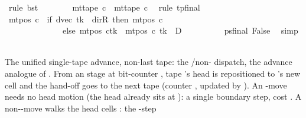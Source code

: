 \begin{isabellebody}
\ {\isacharparenleft}{\kern0pt}rule\ bst{\isacharparenright}{\kern0pt}\isanewline
\ \ \ \ \ \ \isamarkupfalse%
\ {\isachardoublequoteopen}mt{\isacharunderscore}{\kern0pt}tape\ c{\isacharprime}{\kern0pt}\ {\isacharequal}{\kern0pt}\ mt{\isacharunderscore}{\kern0pt}tape\ c{}{\isachardoublequoteclose}\ \isamarkupfalse%
\ {\isacharparenleft}{\kern0pt}rule\ tp{\isacharunderscore}{\kern0pt}final{\isacharparenright}{\kern0pt}\isanewline
\ \ \ \ \ \ \isamarkupfalse%
\ {\isachardoublequoteopen}mt{\isacharunderscore}{\kern0pt}pos\ c{\isacharprime}{\kern0pt}\ {\isacharequal}{\kern0pt}\ {\isacharparenleft}{\kern0pt}if\ dvec\ tk\ {\isacharequal}{\kern0pt}\ dir{\isachardot}{\kern0pt}R\ then\ mt{\isacharunderscore}{\kern0pt}pos\ c{}\isanewline
\ \ \ \ \ \ \ \ \ \ \ \ \ \ else\ {\isacharparenleft}{\kern0pt}mt{\isacharunderscore}{\kern0pt}pos\ c{}{\isacharparenright}{\kern0pt}{\isacharparenleft}{\kern0pt}tk\ {\isacharcolon}{\kern0pt}{\isacharequal}{\kern0pt}\ mt{\isacharunderscore}{\kern0pt}pos\ c{}\ tk\ {\isacharminus}{\kern0pt}\ {\isacharquery}{\kern0pt}D{\isacharparenright}{\kern0pt}{\isacharparenright}{\kern0pt}{\isachardoublequoteclose}\isanewline
\ \ \ \ \ \ \ \ \isamarkupfalse%
\ ps{\isacharunderscore}{\kern0pt}final\ False\ \isamarkupfalse%
\ simp\isanewline
\ \ \ \ \isamarkupfalse%
\isanewline
\ \ \isamarkupfalse%
\isanewline
{}\isamarkupfalse%
%
\endisatagproof
{\isafoldproof}%
%
\isadelimproof
%
\endisadelimproof
%
\begin{isamarkuptext}%
The unified single-tape advance, non-last tape: the
  /non- dispatch, the advance analogue of
  .  From an  stage at
  bit-counter , tape 's head is repositioned to
  's new cell and the hand-off goes to the next tape
   (counter ,  updated by
  ).  An -move needs no head motion (the
  head already sits at ): a single boundary
  step, cost .  A non--move walks the head
   cells : the -step

\end{isamarkuptext}
\end{isabellebody}
